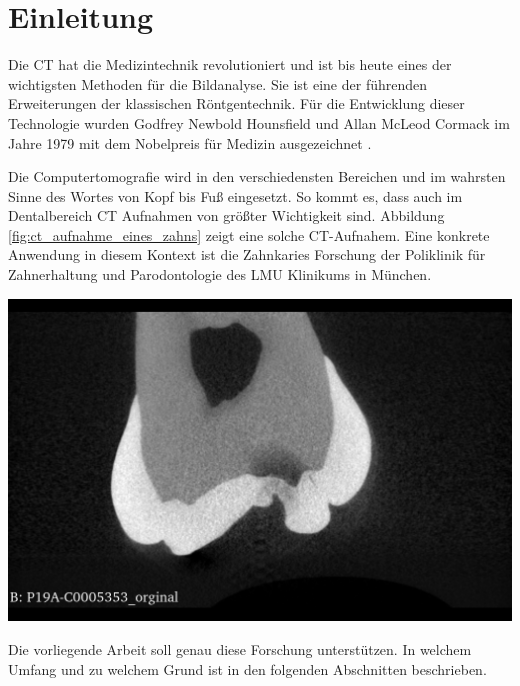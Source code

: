 \chapter{Einleitung}
\label{chap:einleitung} Die \ac{CT} hat die Medizintechnik revolutioniert und
ist bis heute eines der wichtigsten Methoden für die Bildanalyse. Sie ist eine der
führenden Erweiterungen der klassischen Röntgentechnik. Für die Entwicklung
dieser Technologie wurden Godfrey Newbold Hounsfield und Allan McLeod Cormack im
Jahre 1979 mit dem Nobelpreis für Medizin ausgezeichnet \citep[Seite12]{handels2000}.

\begin{minipage}{0.40\textwidth}
	Die Computertomografie wird in den verschiedensten Bereichen und im wahrsten Sinne
	des Wortes von Kopf bis Fuß eingesetzt. So kommt es, dass auch im Dentalbereich
	CT Aufnahmen von größter Wichtigkeit sind. Abbildung
	\ref{fig:ct_aufnahme_eines_zahns} zeigt eine solche CT-Aufnahem. Eine konkrete
	Anwendung in diesem Kontext ist die Zahnkaries Forschung der Poliklinik für Zahnerhaltung
	und Parodontologie des LMU Klinikums in München.
\end{minipage}
\hfill
\begin{minipage}{0.50\textwidth}
	\centering
	\includegraphics[scale=0.2, width=\textwidth]{img/micro_ct_orginal.jpg}
	 \label{fig:ct_aufnahme_eines_zahns}
\end{minipage}

Die vorliegende Arbeit soll genau diese Forschung unterstützen. In welchem
Umfang und zu welchem Grund ist in den folgenden Abschnitten beschrieben.


